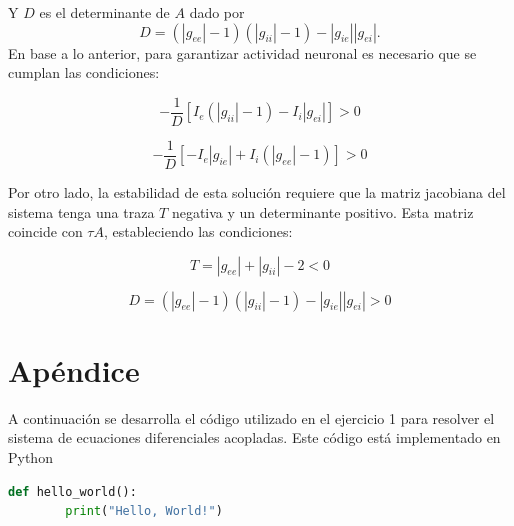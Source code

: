 \documentclass[aps,prb,twocolumn,superscriptaddress,floatfix,longbibliography]{revtex4-2}
\newcounter{para}
\begin{document}
Y \(D\) es el determinante de \(A\) dado por
\[D = (|g_{ee}| - 1)(|g_{ii}| - 1) - |g_{ie}||g_{ei}|.\]
En base a lo anterior, para garantizar actividad neuronal es necesario que se cumplan las condiciones:

\[ -\frac{1}{D} [ I_e (|g_{ii}| - 1) - I_i |g_{ei}| ] > 0 \]

\[ -\frac{1}{D} [ -I_e |g_{ie}| + I_i (|g_{ee}| - 1) ] > 0 \]

Por otro lado, la estabilidad de esta solución requiere que la matriz jacobiana del sistema tenga una traza \(T\) negativa y un determinante positivo. Esta matriz coincide con \(\tau A\), estableciendo las condiciones:

\[ T = |g_{ee}| + |g_{ii}| - 2 < 0 \]

\[ D = (|g_{ee}| - 1)(|g_{ii}| - 1) - |g_{ie}||g_{ei}| > 0 \]



\section{Apéndice}

A continuación se desarrolla el código utilizado en el ejercicio 1 para resolver el sistema de ecuaciones diferenciales acopladas. Este código está implementado en Python

\begin{lstlisting}[language=Python]
    def hello_world():
        print("Hello, World!")
    \end{lstlisting}
    


\end{document}
